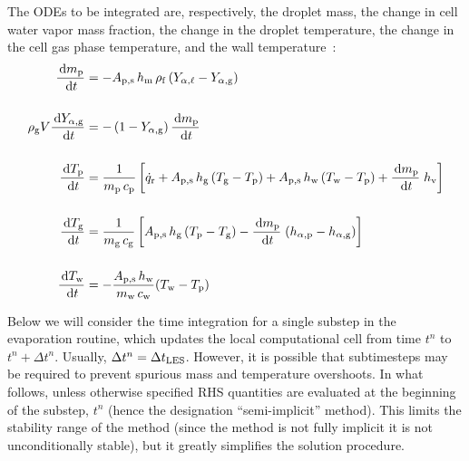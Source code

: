 The ODEs to be integrated are, respectively, the droplet mass, the change in cell water vapor mass fraction, the change in the droplet temperature, the change in the cell gas phase temperature, and the wall temperature~\cite{Cheremisinoff:1}:
\begin{align}
\frac{\,\mathrm{d} m_{\rm p}}{\,\mathrm{d} t} & = - A_{\rm p,s} \, h_{\rm m} \, \rho_{\rm f} \, (Y_{\alpha,\ell} - Y_{\rm \alpha, g}) \label{app_droplet_mass} \\[0.2in]
\rho_{\rm g} V \frac{\,\mathrm{d} Y_{\rm \alpha, g}}{\,\mathrm{d} t} & = -\left(1-Y_{\rm \alpha, g}\right)\frac{\,\mathrm{d} m_{\rm p}}{\,\mathrm{d} t}  \label{app_droplet_gas_fraction} \\[0.2in]
\frac{\,\mathrm{d} T_{\rm p}}{\,\mathrm{d} t} & = \frac{1}{m_{\rm p} \, c_{\rm p}}  \left[ \dot{q}_{\rm r} + A_{\rm p,s} \, h_{\rm g}  \, (T_{\rm g}-T_{\rm p}) + A_{\rm p,s} \, h_{\rm w}  \, (T_{\rm w}-T_{\rm p}) + \frac{\,\mathrm{d} m_{\rm p}}{\,\mathrm{d} t} \; h_{\rm v} \right]  \label{app_droplet_temp}  \\[0.2in]
\frac{\,\mathrm{d} T_{\rm g}}{\,\mathrm{d} t} & = \frac{1}{m_{\rm g} \, c_{\rm g}}  \left[A_{\rm p,s} \, h_{\rm g}  \, (T_{\rm p}-T_{\rm g}) - \frac{\,\mathrm{d} m_{\rm p}}{\,\mathrm{d} t} \; (h_{\rm \alpha,p}-h_{\rm \alpha,g}) \right]  \label{app_droplet_gas_temp}   \\[0.2in]
\frac{\,\mathrm{d} T_{\rm w}}{\,\mathrm{d} t} & = -\frac{A_{\rm p,s} \, h_{\rm w}}{m_{\rm w} \, c_{\rm w}} (T_{\rm w}-T_{\rm p})  \label{app_droplet_solid_temp}
\end{align}

   Below we will consider the time integration for a single substep in the evaporation routine, which updates the local computational cell from time $t^n$ to $t^n + \Delta t^n$.  Usually, $\Delta t^n = \Delta t_{\mathrm{\tiny LES}}$.  However, it is possible that subtimesteps may be required to prevent spurious mass and temperature overshoots.  In what follows, unless otherwise specified RHS quantities are evaluated at the beginning of the substep, $t^n$ (hence the designation ``semi-implicit'' method).  This limits the stability range of the method (since the method is not fully implicit it is not unconditionally stable), but it greatly simplifies the solution procedure.

